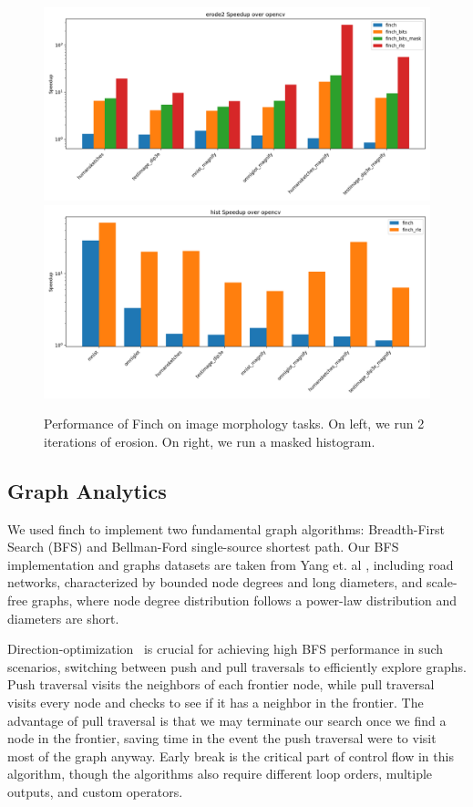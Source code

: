 \begin{figure}
	\includegraphics[width=0.5\linewidth]{erode2_speedup_over_opencv.png}%
	\includegraphics[width=0.5\linewidth]{hist_speedup_over_opencv.png}
 \vspace{-12pt}
    \caption{Performance of Finch on image morphology tasks. On left, we run 2 iterations of erosion. On right, we run a masked histogram.}\label{fig:morphology}
\end{figure}

\subsection{Graph Analytics}

We used finch to implement two fundamental graph algorithms: Breadth-First Search (BFS) and Bellman-Ford single-source shortest path. Our BFS implementation and graphs datasets are taken from Yang et. al \cite{yang_implementing_2018}, including road networks, characterized by bounded node degrees and long diameters, and scale-free graphs, where node degree distribution follows a power-law distribution and diameters are short.

Direction-optimization~\cite{beamer2012direction} is crucial for achieving high BFS performance in such scenarios, switching between push and pull traversals to efficiently explore graphs. Push traversal visits the neighbors of each frontier node, while pull traversal visits every node and checks to see if it has a neighbor in the frontier. The advantage of pull traversal is that we may terminate our search once we find a node in the frontier, saving time in the event the push traversal were to visit most of the graph anyway. Early break is the critical part of control flow in this algorithm, though the algorithms also require different loop orders, multiple outputs, and custom operators.

